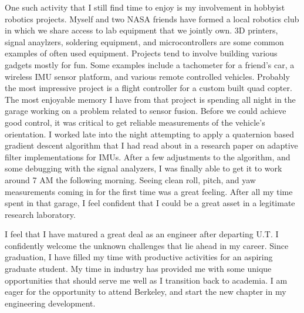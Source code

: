 \documentclass{article}
\begin{document}
One such activity that I still find time to enjoy is my involvement
in hobbyist robotics projects. Myself and two NASA friends have formed a local robotics club
in which we share access to lab equipment that we jointly own. 3D printers, signal anaylzers, 
soldering equipment, and microcontrollers are some common examples of often used equipment.
Projects tend to involve building various gadgets mostly for fun. Some examples include a 
tachometer for a friend's car, a wireless IMU sensor platform, and various remote controlled
vehicles. Probably the most impressive project is a flight controller for a custom built quad
copter. The most enjoyable memory I have from that project is spending all night in the garage
working on a problem related to sensor fusion. Before we could achieve good control, it was
critical to get reliable measurements of the vehicle's orientation. I worked late into the
night attempting to apply a quaternion based gradient descent algorithm that I had read about in
a research paper on adaptive filter implementations for IMUs. After a few adjustments to the
algorithm, and some debugging with the signal analyzers, I was finally able to get 
it to work around 7 AM the following morning. Seeing clean roll, pitch, and yaw measurements 
coming in for the first time was a great feeling.
After all my time spent in that garage, I feel confident that I could be a great asset in a legitimate research laboratory.  

I feel that I have matured a great deal as an engineer after departing U.T. I confidently 
welcome the unknown challenges that lie ahead in my career. Since graduation, I have filled my time
with productive activities for an aspiring graduate student. My time in industry has provided me
with some unique opportunities that should serve me well as I transition back to academia.
I am eager for the opportunity to attend Berkeley, and start the new chapter in my engineering development. 
\end{document}
